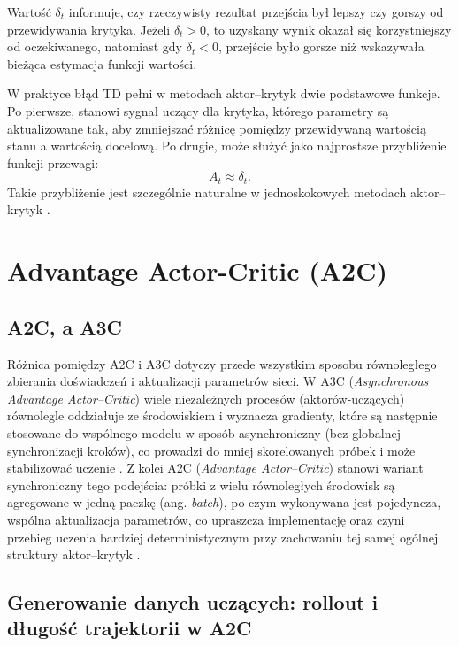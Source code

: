 Wartość $\delta_t$ informuje, czy rzeczywisty rezultat przejścia
był lepszy czy gorszy od przewidywania krytyka.
Jeżeli $\delta_t > 0$, to uzyskany wynik okazał się korzystniejszy od oczekiwanego,
natomiast gdy $\delta_t < 0$, przejście było gorsze niż wskazywała bieżąca estymacja
funkcji wartości.

W praktyce błąd TD pełni w metodach aktor--krytyk dwie podstawowe funkcje.
Po pierwsze, stanowi sygnał uczący dla krytyka, którego parametry są aktualizowane
tak, aby zmniejszać różnicę pomiędzy przewidywaną wartością stanu a wartością docelową.
Po drugie, może służyć jako najprostsze przybliżenie funkcji przewagi:
\[
A_t \approx \delta_t.
\]
Takie przybliżenie jest szczególnie naturalne w jednoskokowych metodach
aktor--krytyk \cite{SuttonBarto2018}.

\section{Advantage Actor-Critic (A2C)}

\subsection*{A2C, a A3C}

Różnica pomiędzy A2C i A3C dotyczy przede wszystkim sposobu równoległego zbierania doświadczeń i aktualizacji parametrów sieci. W A3C (\textit{Asynchronous Advantage Actor--Critic}) wiele niezależnych procesów (aktorów-uczących) równolegle oddziałuje ze środowiskiem i wyznacza gradienty, które są następnie stosowane do wspólnego modelu w sposób asynchroniczny (bez globalnej synchronizacji kroków), co prowadzi do mniej skorelowanych próbek i może stabilizować uczenie \cite{mnih2016}. Z kolei A2C (\textit{Advantage Actor--Critic}) stanowi wariant synchroniczny tego podejścia: próbki z wielu równoległych środowisk są agregowane w jedną paczkę (ang. \textit{batch}), po czym wykonywana jest pojedyncza, wspólna aktualizacja parametrów, co upraszcza implementację oraz czyni przebieg uczenia bardziej deterministycznym przy zachowaniu tej samej ogólnej struktury aktor--krytyk \cite{openaiBaselinesA2C}.

\subsection*{Generowanie danych uczących: rollout i długość trajektorii w A2C}

